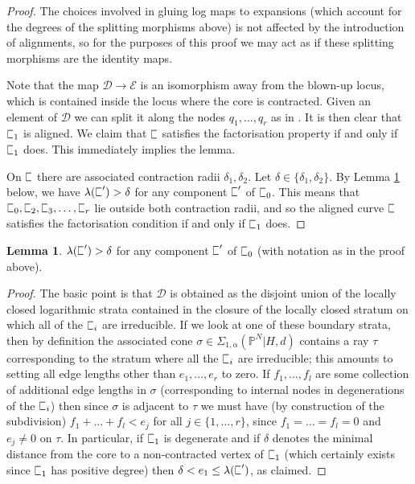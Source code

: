 \documentclass[11pt]{amsart}
\newcommand{\sqC}{\scalebox{0.8}[1.3]{$\sqsubset$}}
\newcommand{\PP}{\mathbb P}
\renewcommand{\to}{\rightarrow}
\newcommand{\Dcal}{\mathcal{D}}
\newcommand{\Ecal}{\mathcal{E}}
\theoremstyle{definition}
\newtheorem{lemma}[thm]{Lemma}
\theoremstyle{definition}
\begin{document}
\begin{proof}
The choices involved in gluing log maps to expansions (which account for the degrees of the splitting morphisms above) is not affected by the introduction of alignments, so for the purposes of this proof we may act as if these splitting morphisms are the identity maps.

Note that the map $\Dcal\to\Ecal$ is an isomorphism away from the blown-up locus, which is contained inside the locus where the core is contracted. Given an element of $\Dcal$ we can split it along the nodes $q_1,\ldots,q_r$ as in \cite{}. It is then clear that $\sqC_1$ is aligned. We claim that $\sqC$ satisfies the factorisation property if and only if $\sqC_1$ does. This immediately implies the lemma.

On $\sqC$ there are associated contraction radii $\delta_1,\delta_2$. Let $\delta \in \{\delta_1,\delta_2\}$. By Lemma \ref{type A radius lemma} below, we have $\lambda(\sqC^\prime) > \delta$ for any component $\sqC^\prime$ of $\sqC_0$. This means that $\sqC_0,\sqC_2,\sqC_3,\ldots,\sqC_r$ lie outside both contraction radii, and so the aligned curve $\sqC$ satisfies the factorisation condition if and only if $\sqC_1$ does. \end{proof}

\begin{lemma}\label{type A radius lemma} $\lambda(\sqC^\prime) > \delta$ for any component $\sqC^\prime$ of $\sqC_0$ (with notation as in the proof above).\end{lemma}
\begin{proof} The basic point is that $\Dcal$ is obtained as the disjoint union of the locally closed logarithmic strata contained in the closure of the locally closed stratum on which all of the $\sqC_i$ are irreducible. If we look at one of these boundary strata, then by definition the associated cone $\sigma \in \Sigma_{1,\alpha}(\PP^N|H,d)$ contains a ray $\tau$ corresponding to the stratum where all the $\sqC_i$ are irreducible; this amounts to setting all edge lengths other than $e_1,\ldots,e_r$ to zero. If $f_1,\ldots,f_l$ are some collection of additional edge lengths in $\sigma$ (corresponding to internal nodes in degenerations of the $\sqC_i$) then since $\sigma$ is adjacent to $\tau$ we must have (by construction of the subdivision) $f_1+\ldots+f_l < e_j$ for all $j\in\{1,\ldots,r\}$, since $f_1=\ldots=f_l=0$ and $e_j \neq 0$ on $\tau$. In particular, if $\sqC_1$ is degenerate and if $\delta$ denotes the minimal distance from the core to a non-contracted vertex of $\sqC_1$ (which certainly exists since $\sqC_1$ has positive degree) then $\delta < e_1 \leq \lambda(\sqC^\prime)$, as claimed.\end{proof}
\end{document}
